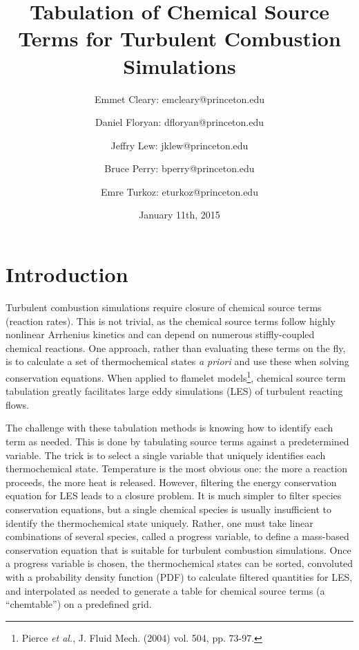 \documentclass[11pt]{article}
\begin{document}
\title{\textbf{Tabulation of Chemical Source Terms for Turbulent
    Combustion Simulations}}

\author{Emmet Cleary: emcleary@princeton.edu \and Daniel Floryan:
  dfloryan@princeton.edu \and Jeffry Lew: jklew@princeton.edu \and
  Bruce Perry: bperry@princeton.edu \and Emre Turkoz:
  eturkoz@princeton.edu} 

\date{January 11th, 2015 }
\maketitle

\section{Introduction}
Turbulent combustion simulations require closure of chemical source
terms (reaction rates). This is not trivial, as the chemical source
terms follow highly nonlinear Arrhenius kinetics and can depend on
numerous stiffly-coupled chemical reactions. One approach, rather than
evaluating these terms on the fly, is to calculate a set of
thermochemical states \textit{a priori} and use these when solving
conservation equations. When applied to flamelet
models\footnote{Pierce \textit{et al.}, J. Fluid Mech. (2004)
  vol. 504, pp. 73-97.}, chemical source term tabulation greatly
facilitates large eddy simulations (LES) of turbulent reacting flows.

The challenge with these tabulation methods is knowing how to identify
each term as needed.  This is done by tabulating source terms against
a predetermined variable. The trick is to select a single variable
that uniquely identifies each thermochemical state. Temperature is the
most obvious one: the more a reaction proceeds, the more heat is
released. However, filtering the energy conservation equation for LES
leads to a closure problem. It is much simpler to filter species
conservation equations, but a single chemical species is usually
insufficient to identify the thermochemical state uniquely. Rather,
one must take linear combinations of several species, called a
progress variable, to define a mass-based conservation equation that
is suitable for turbulent combustion simulations. Once a progress
variable is chosen, the thermochemical states can be sorted,
convoluted with a probability density function (PDF) to calculate
filtered quantities for LES, and interpolated as needed to generate a
table for chemical source terms (a “chemtable”) on a predefined grid.
\end{document}
